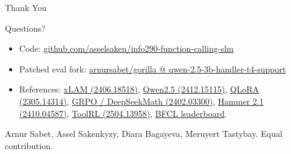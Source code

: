\documentclass[aspectratio=169,11pt]{beamer}
\begin{document}
\begin{frame}{Thank You}
  \begin{center}
    \Large Questions?
  \end{center}
  \vspace{6pt}
  \begin{itemize}
    \item Code: \href{https://github.com/asselsaken/info290-function-calling-slm}{github.com/asselsaken/info290-function-calling-slm}
    \item Patched eval fork: \href{https://github.com/arnursabet/gorilla/tree/qwen-2.5-3b-handler-t4-support}{arnursabet/gorilla @ qwen-2.5-3b-handler-t4-support}
    \item References: \href{https://arxiv.org/abs/2406.18518}{xLAM (2406.18518)}, \href{https://arxiv.org/abs/2412.15115}{Qwen2.5 (2412.15115)}, \href{https://arxiv.org/abs/2305.14314}{QLoRA (2305.14314)}, \href{https://arxiv.org/abs/2402.03300}{GRPO / DeepSeekMath (2402.03300)}, \href{https://arxiv.org/abs/2410.04587}{Hammer 2.1 (2410.04587)}, \href{https://arxiv.org/abs/2504.13958}{ToolRL (2504.13958)}, \href{https://gorilla.cs.berkeley.edu/leaderboard.html}{BFCL leaderboard}.
  \end{itemize}
  \vspace{6pt}
  {\small\color{dimgray} Arnur Sabet, Assel Sakenkyzy, Diara Bagayeva, Meruyert Tastybay. Equal contribution.}
\end{frame}
\end{document}
